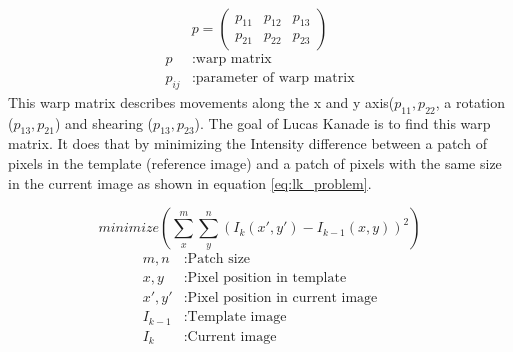 \documentclass[11pt,a4paper,titlepage,oneside]{report}
\begin{document}
\begin{equation}\label{eq:lk_warp}
  p=\begin{pmatrix}
    p_{11} & p_{12} & p_{13} \\
    p_{21} & p_{22} & p_{23}
  \end{pmatrix}
\end{equation}
\begin{align*}
  p        &:  \text{warp matrix}\\
  p_{ij}  &:  \text{parameter of warp matrix}
\end{align*}
This warp matrix describes movements along the x and y axis($p_{11},p_{22}$, a rotation ($p_{13},p_{21}$) and shearing ($p_{13},p_{23}$). The goal of Lucas Kanade is to find this warp matrix. It does that by minimizing the Intensity difference between a patch of pixels in the template (reference image) and a patch of pixels with the same size in the current image as shown in equation \ref{eq:lk_problem}. 

\begin{equation}\label{eq:lk_problem}
	minimize(\sum_x^m\sum_y^n(I_{k}(x',y')-I_{k-1}(x,y))^2)
\end{equation}
\begin{align*}
	m,n				 &: \text{Patch size}\\
  x,y        &: \text{Pixel position in template}\\
  x',y'      &: \text{Pixel position in current image}\\
  I_{k-1}    &: \text{Template image}\\
  I_{k}      &: \text{Current image}
\end{align*}
\end{document}
